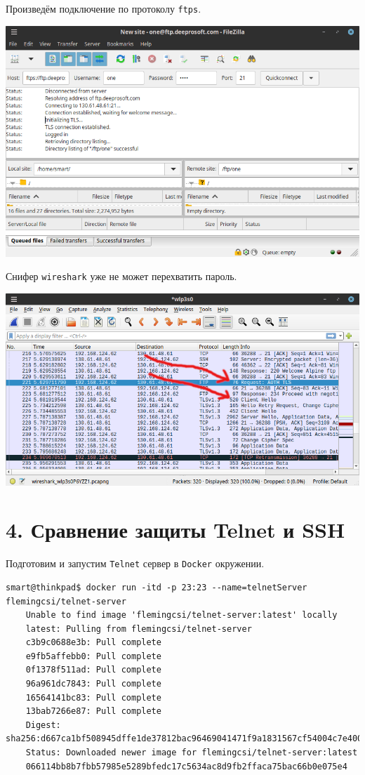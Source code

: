 \newpage

Произведём подключение по протоколу \texttt{ftps}.
\begin{center}
    \includegraphics[scale=0.55]{res/5.filezilla-ftps.png}
\end{center}

Снифер \texttt{wireshark} уже не может перехватить пароль.
\begin{center}
    \includegraphics[scale=0.55]{res/5.wireshark-ftps.png}
\end{center}

\newpage

\section*{4. Сравнение защиты Telnet и SSH}

Подготовим и запустим \texttt{Telnet} сервер в \texttt{Docker} окружении.
\begin{Verbatim}[frame=single]
    smart@thinkpad$ docker run -itd -p 23:23 --name=telnetServer flemingcsi/telnet-server
    Unable to find image 'flemingcsi/telnet-server:latest' locally
    latest: Pulling from flemingcsi/telnet-server
    c3b9c0688e3b: Pull complete 
    e9fb5affebb0: Pull complete 
    0f1378f511ad: Pull complete 
    96a961dc7843: Pull complete 
    16564141bc83: Pull complete 
    13bab7266e87: Pull complete 
    Digest: sha256:d667ca1bf508945dffe1de37812bac96469041471f9a1831567cf54004c7e400
    Status: Downloaded newer image for flemingcsi/telnet-server:latest
    066114bb8b7fbb57985e5289bfedc17c5634ac8d9fb2ffaca75bac66b0e075e4
\end{Verbatim}

